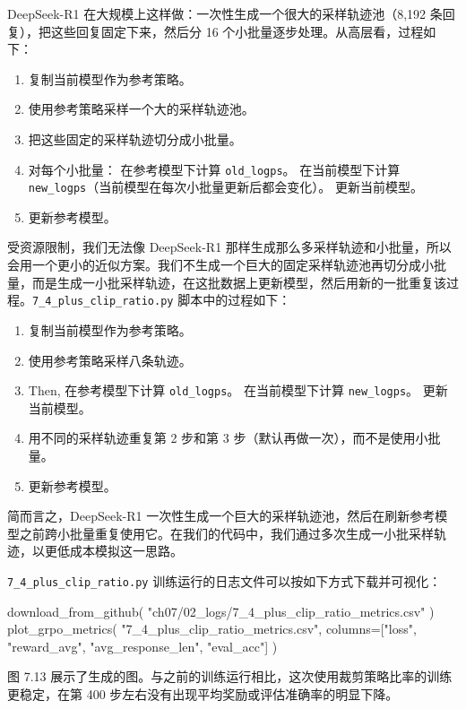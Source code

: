 DeepSeek-R1 在大规模上这样做：一次性生成一个很大的采样轨迹池（8,192 条回复），把这些回复固定下来，然后分 16 个小批量逐步处理。从高层看，过程如下：

\begin{enumerate}
\item 复制当前模型作为参考策略。
\item 使用参考策略采样一个大的采样轨迹池。
\item 把这些固定的采样轨迹切分成小批量。
\item 对每个小批量： 在参考模型下计算 \texttt{old\_logps}。 在当前模型下计算 \texttt{new\_logps}（当前模型在每次小批量更新后都会变化）。 更新当前模型。
\item 更新参考模型。
\end{enumerate}

受资源限制，我们无法像 DeepSeek-R1 那样生成那么多采样轨迹和小批量，所以会用一个更小的近似方案。我们不生成一个巨大的固定采样轨迹池再切分成小批量，而是生成一小批采样轨迹，在这批数据上更新模型，然后用新的一批重复该过程。\texttt{7\_4\_plus\_clip\_ratio.py} 脚本中的过程如下：

\begin{enumerate}
\item 复制当前模型作为参考策略。
\item 使用参考策略采样八条轨迹。
\item Then, 在参考模型下计算 \texttt{old\_logps}。 在当前模型下计算 \texttt{new\_logps}。 更新当前模型。
\item 用不同的采样轨迹重复第 2 步和第 3 步（默认再做一次），而不是使用小批量。
\item 更新参考模型。
\end{enumerate}

简而言之，DeepSeek-R1 一次性生成一个巨大的采样轨迹池，然后在刷新参考模型之前跨小批量重复使用它。在我们的代码中，我们通过多次生成一小批采样轨迹，以更低成本模拟这一思路。

\texttt{7\_4\_plus\_clip\_ratio.py} 训练运行的日志文件可以按如下方式下载并可视化：

\begin{codebox}
download_from_github(
    "ch07/02_logs/7_4_plus_clip_ratio_metrics.csv"
)
plot_grpo_metrics(
    "7_4_plus_clip_ratio_metrics.csv",
    columns=["loss", "reward_avg", "avg_response_len", "eval_acc"]
)
\end{codebox}

图 7.13 展示了生成的图。与之前的训练运行相比，这次使用裁剪策略比率的训练更稳定，在第 400 步左右没有出现平均奖励或评估准确率的明显下降。

